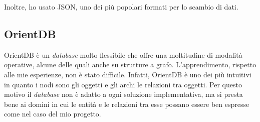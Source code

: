	Inoltre, ho usato \gls{JSON}, uno dei più popolari formati per lo scambio di dati.

	\subsection*{OrientDB} 
	OrientDB è un \textit{database} molto flessibile che offre una moltitudine di modalità operative, alcune delle quali anche su strutture a grafo. L'apprendimento, rispetto alle mie esperienze, non è stato difficile. Infatti, OrientDB è uno dei più intuitivi in quanto i nodi sono gli oggetti e gli archi le relazioni tra oggetti. Per questo motivo il \textit{database} non è adatto a ogni soluzione implementativa, ma si presta bene ai domini in cui le entità e le relazioni tra esse possano essere ben espresse come nel caso del mio progetto.

